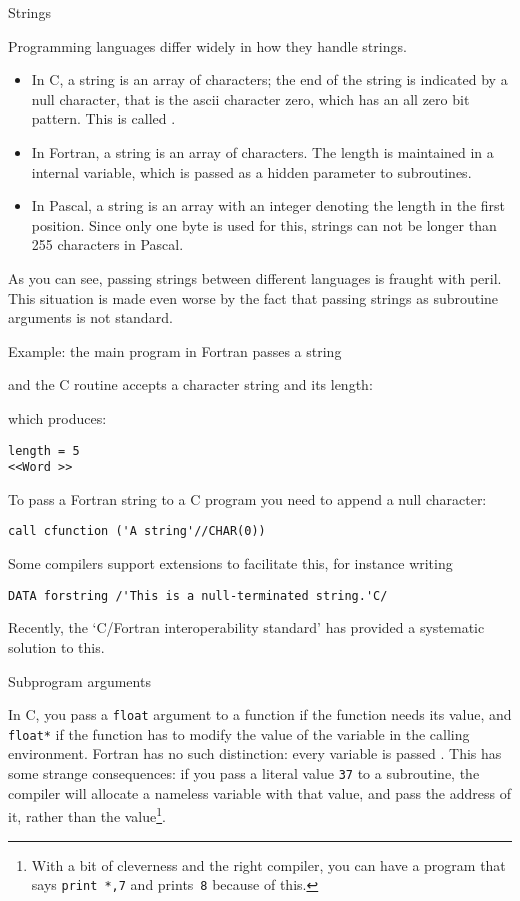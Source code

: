 
 {Strings}

Programming languages differ widely in how they handle strings. 
\begin{itemize}
\item In C, a string is an array of characters; the end of the string
  is indicated by a null character, that is the ascii character zero,
  which has an all zero bit pattern. This is called .
\item In Fortran, a string is an array of characters. The length is
  maintained in a internal variable, which is passed as a hidden
  parameter to subroutines.
\item In Pascal, a string is an array with an integer denoting the
  length in the first position. Since only one byte is used for this,
  strings can not be longer than 255 characters in Pascal.
\end{itemize}
As you can see, passing strings between different languages is fraught
with peril. This situation is made even worse by the fact that passing
strings as subroutine arguments is not standard.

Example: the main program in Fortran passes a string

and the C routine accepts a character string and its length:

which produces:
\begin{verbatim}
length = 5
<<Word >>
\end{verbatim}

To pass a Fortran string to a C program you need to append a null
character:
\begin{verbatim}
call cfunction ('A string'//CHAR(0))
\end{verbatim}
Some compilers support extensions
to facilitate this, for instance writing
\begin{verbatim}
DATA forstring /'This is a null-terminated string.'C/
\end{verbatim}
Recently, the `C/Fortran interoperability standard' has
provided a systematic solution to this.

 {Subprogram arguments}

In C, you pass a \texttt{float} argument to a function if the function
needs its value, and \texttt{float*} if the function has to modify the
value of the variable in the calling environment. Fortran has no such
distinction: every variable is passed . This
has some strange consequences: if you pass a literal value
\texttt{37} to a subroutine, the compiler will allocate a nameless
variable with that value, and pass the address of it, rather than the
value\footnote{With a bit of cleverness and the right compiler, you
  can have a program that says \texttt{print *,7} and
  prints~\texttt{8} because of this.}.

